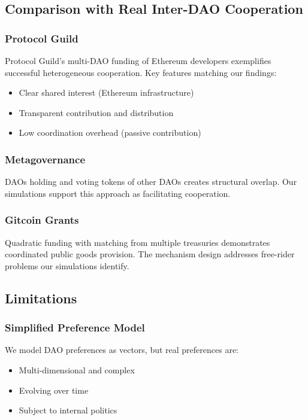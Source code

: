 \subsection{Comparison with Real Inter-DAO Cooperation}

\subsubsection{Protocol Guild}

Protocol Guild's multi-DAO funding of Ethereum developers exemplifies successful heterogeneous cooperation. Key features matching our findings:
\begin{itemize}
    \item Clear shared interest (Ethereum infrastructure)
    \item Transparent contribution and distribution
    \item Low coordination overhead (passive contribution)
\end{itemize}

\subsubsection{Metagovernance}

DAOs holding and voting tokens of other DAOs creates structural overlap. Our simulations support this approach as facilitating cooperation.

\subsubsection{Gitcoin Grants}

Quadratic funding with matching from multiple treasuries demonstrates coordinated public goods provision. The mechanism design addresses free-rider problems our simulations identify.

\subsection{Limitations}

\subsubsection{Simplified Preference Model}

We model DAO preferences as vectors, but real preferences are:
\begin{itemize}
    \item Multi-dimensional and complex
    \item Evolving over time
    \item Subject to internal politics
\end{itemize}

